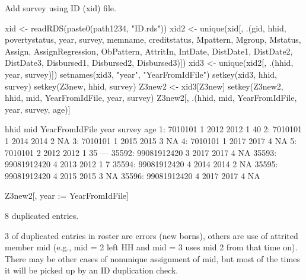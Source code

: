 Add \textsf{survey} using ID (\textsf{xid}) file. %
\gobblepars
\begin{Schunk}
\begin{Sinput}
xid <- readRDS(paste0(path1234, "ID.rds"))
xid2 <- unique(xid[, .(gid, hhid, povertystatus, year, survey, memname, 
	creditstatus, Mpattern, Mgroup, Mstatus, Assign, AssignRegression, 
	ObPattern, AttritIn,
	IntDate, DistDate1, DistDate2, DistDate3, Disbursed1, Disbursed2, Disbursed3)])
xid3 <- unique(xid2[, .(hhid, year, survey)])
setnames(xid3, "year", "YearFromIdFile")
setkey(xid3, hhid, survey)
setkey(Z3new, hhid, survey)
Z3new2 <- xid3[Z3new]
setkey(Z3new2, hhid, mid, YearFromIdFile, year, survey)
Z3new2[, .(hhid, mid, YearFromIdFile, year, survey, age)]
\end{Sinput}
\begin{Soutput}
              hhid mid YearFromIdFile year survey age
    1:     7010101   1           2012 2012      1  40
    2:     7010101   1           2014 2014      2  NA
    3:     7010101   1           2015 2015      3  NA
    4:     7010101   1           2017 2017      4  NA
    5:     7010101   2           2012 2012      1  35
   ---                                               
35592: 99081912420   3           2017 2017      4  NA
35593: 99081912420   4           2013 2012      1   7
35594: 99081912420   4           2014 2014      2  NA
35595: 99081912420   4           2015 2015      3  NA
35596: 99081912420   4           2017 2017      4  NA
\end{Soutput}
\begin{Sinput}
Z3new2[, year := YearFromIdFile]
\end{Sinput}
\end{Schunk}
\begin{Schunk}
\begin{Soutput}
[1] 8 duplicated entries.
\end{Soutput}
\end{Schunk}
3 of duplicated entries in roster are errors (new borns), others are use of attrited member mid (e.g., mid = 2 left HH and mid = 3 uses mid 2 from that time on). There may be other cases of nonunique assignment of mid, but most of the times it will be picked up by an ID duplication check.
